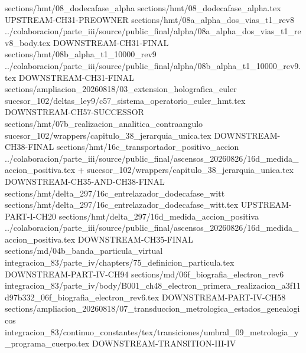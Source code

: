 \HMTRegisterLiveInputEdge
  {sections/hmt/08_dodecafase_alpha}
  {sections/hmt/08_dodecafase_alpha.tex}
  {UPSTREAM-CH31-PREOWNER}
\HMTRegisterLiveInputEdge
  {sections/hmt/08a_alpha_dos_vias_t1_rev8}
  {../colaboracion/parte_iii/source/public_final/alpha/08a_alpha_dos_vias_t1_rev8_body.tex}
  {DOWNSTREAM-CH31-FINAL}
\HMTRegisterLiveInputEdge
  {sections/hmt/08b_alpha_t1_10000_rev9}
  {../colaboracion/parte_iii/source/public_final/alpha/08b_alpha_t1_10000_rev9.tex}
  {DOWNSTREAM-CH31-FINAL}
\HMTRegisterLiveInputEdge
  {sections/ampliacion_20260818/03_extension_holografica_euler}
  {sucesor_102/deltas_ley9/c57_sistema_operatorio_euler_hmt.tex}
  {DOWNSTREAM-CH57-SUCCESSOR}
\HMTRegisterLiveInputEdge
  {sections/hmt/07b_realizacion_analitica_contraangulo}
  {sucesor_102/wrappers/capitulo_38_jerarquia_unica.tex}
  {DOWNSTREAM-CH38-FINAL}
\HMTRegisterLiveInputEdge
  {sections/hmt/16c_transportador_positivo_accion}
  {../colaboracion/parte_iii/source/public_final/ascensos_20260826/16d_medida_accion_positiva.tex + sucesor_102/wrappers/capitulo_38_jerarquia_unica.tex}
  {DOWNSTREAM-CH35-AND-CH38-FINAL}
\HMTRegisterLiveInputEdge
  {sections/hmt/delta_297/16c_entrelazador_dodecafase_witt}
  {sections/hmt/delta_297/16c_entrelazador_dodecafase_witt.tex}
  {UPSTREAM-PART-I-CH20}
\HMTRegisterLiveInputEdge
  {sections/hmt/delta_297/16d_medida_accion_positiva}
  {../colaboracion/parte_iii/source/public_final/ascensos_20260826/16d_medida_accion_positiva.tex}
  {DOWNSTREAM-CH35-FINAL}
\HMTRegisterLiveInputEdge
  {sections/md/04b_banda_particula_virtual}
  {integracion_83/parte_iv/chapters/75_definicion_particula.tex}
  {DOWNSTREAM-PART-IV-CH94}
\HMTRegisterLiveInputEdge
  {sections/md/06f_biografia_electron_rev6}
  {integracion_83/parte_iv/body/B001_ch48_electron_primera_realizacion_a3f11d97b332_06f_biografia_electron_rev6.tex}
  {DOWNSTREAM-PART-IV-CH58}
\HMTRegisterLiveInputEdge
  {sections/ampliacion_20260818/07_transduccion_metrologica_estados_genealogicos}
  {integracion_83/continuo_constantes/tex/transiciones/umbral_09_metrologia_y_programa_cuerpo.tex}
  {DOWNSTREAM-TRANSITION-III-IV}

\renewcommand{\HMTDemoteHeadings}{}
\renewcommand{\HMTRestoreHeadings}{}

